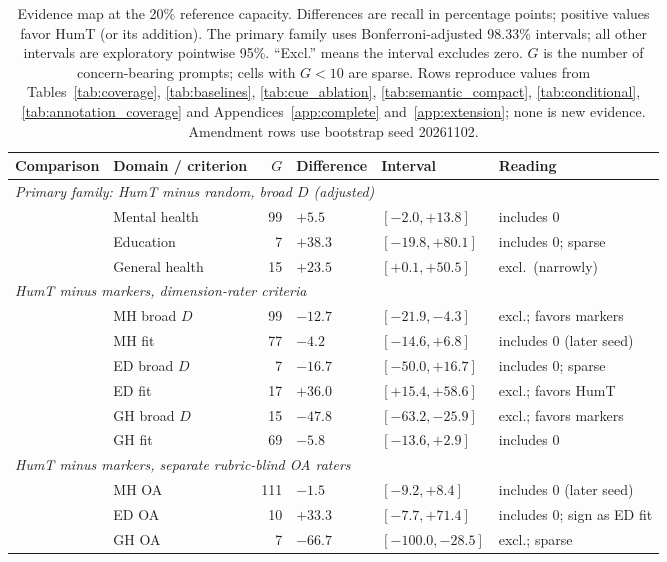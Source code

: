 \begin{table}[t]
\centering\footnotesize
\caption{Evidence map at the 20\% reference capacity. Differences are recall in percentage points; positive values favor HumT (or its addition). The primary family uses Bonferroni-adjusted 98.33\% intervals; all other intervals are exploratory pointwise 95\%. ``Excl.'' means the interval excludes zero. $G$ is the number of concern-bearing prompts; cells with $G<10$ are sparse. Rows reproduce values from Tables~\ref{tab:coverage}, \ref{tab:baselines}, \ref{tab:cue_ablation}, \ref{tab:semantic_compact}, \ref{tab:conditional}, \ref{tab:annotation_coverage} and Appendices~\ref{app:complete} and~\ref{app:extension}; none is new evidence. Amendment rows use bootstrap seed 20261102.}
\label{tab:evidence_summary}
\begin{tabular}{llrlll}
\toprule
Comparison & Domain / criterion & $G$ & Difference & Interval & Reading \\
\midrule
\multicolumn{6}{l}{\emph{Primary family: HumT minus random, broad $D$ (adjusted)}} \\
 & Mental health & 99 & $+5.5$ & $[-2.0, +13.8]$ & includes 0 \\
 & Education & 7 & $+38.3$ & $[-19.8, +80.1]$ & includes 0; sparse \\
 & General health & 15 & $+23.5$ & $[+0.1, +50.5]$ & excl.\ (narrowly) \\
\midrule
\multicolumn{6}{l}{\emph{HumT minus markers, dimension-rater criteria}} \\
 & MH broad $D$ & 99 & $-12.7$ & $[-21.9, -4.3]$ & excl.; favors markers \\
 & MH fit & 77 & $-4.2$ & $[-14.6, +6.8]$ & includes 0 (later seed) \\
 & ED broad $D$ & 7 & $-16.7$ & $[-50.0, +16.7]$ & includes 0; sparse \\
 & ED fit & 17 & $+36.0$ & $[+15.4, +58.6]$ & excl.; favors HumT \\
 & GH broad $D$ & 15 & $-47.8$ & $[-63.2, -25.9]$ & excl.; favors markers \\
 & GH fit & 69 & $-5.8$ & $[-13.6, +2.9]$ & includes 0 \\
\midrule
\multicolumn{6}{l}{\emph{HumT minus markers, separate rubric-blind OA raters}} \\
 & MH OA & 111 & $-1.5$ & $[-9.2, +8.4]$ & includes 0 (later seed) \\
 & ED OA & 10 & $+33.3$ & $[-7.7, +71.4]$ & includes 0; sign as ED fit \\
 & GH OA & 7 & $-66.7$ & $[-100.0, -28.5]$ & excl.; sparse \\

\end{tabular}
\end{table}
